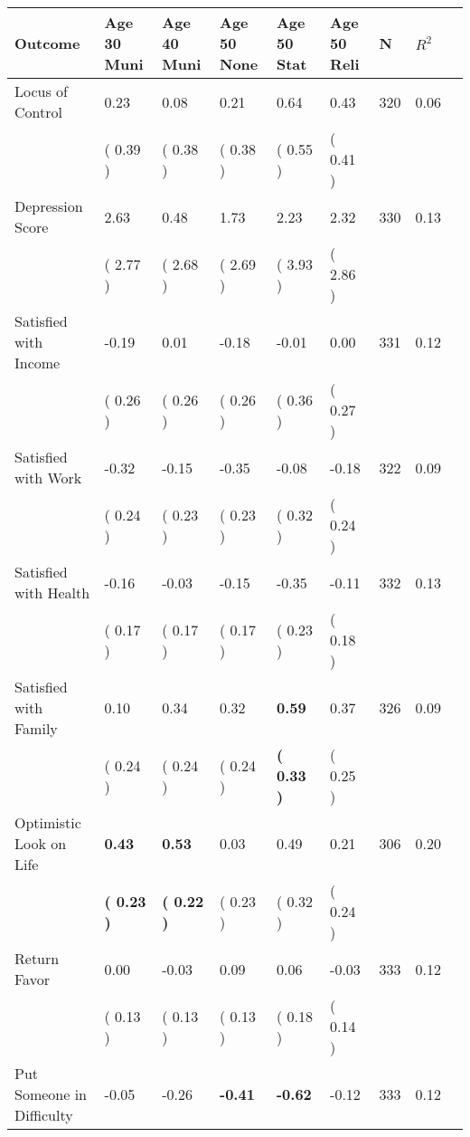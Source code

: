 \begin{tabular}{L{6.2cm} C{1.8cm} C{1.8cm} C{1.8cm} C{1.8cm} C{1.8cm} C{1.8cm} C{0.3cm} C{0.3cm}}
\toprule
 \textbf{Outcome} & \textbf{Age 30 Muni} & \textbf{Age 40 Muni} & \textbf{Age 50 None} & \textbf{Age 50 Stat} & \textbf{Age 50 Reli} & \textbf{N} & \textbf{$ R^2$} \\
\midrule
Locus of Control &      0.23 &      0.08 &      0.21 &      0.64 &      0.43  & 320 &       0.06 \\ 
 & (     0.39 ) & (     0.38 ) & (     0.38 ) & (     0.55 ) & (     0.41 )  & \\
Depression Score &      2.63 &      0.48 &      1.73 &      2.23 &      2.32  & 330 &       0.13 \\ 
 & (     2.77 ) & (     2.68 ) & (     2.69 ) & (     3.93 ) & (     2.86 )  & \\
Satisfied with Income &     -0.19 &      0.01 &     -0.18 &     -0.01 &      0.00  & 331 &       0.12 \\ 
 & (     0.26 ) & (     0.26 ) & (     0.26 ) & (     0.36 ) & (     0.27 )  & \\
Satisfied with Work &     -0.32 &     -0.15 &     -0.35 &     -0.08 &     -0.18  & 322 &       0.09 \\ 
 & (     0.24 ) & (     0.23 ) & (     0.23 ) & (     0.32 ) & (     0.24 )  & \\
Satisfied with Health &     -0.16 &     -0.03 &     -0.15 &     -0.35 &     -0.11  & 332 &       0.13 \\ 
 & (     0.17 ) & (     0.17 ) & (     0.17 ) & (     0.23 ) & (     0.18 )  & \\
Satisfied with Family &      0.10 &      0.34 &      0.32 & \textbf{     0.59} &      0.37  & 326 &       0.09 \\ 
 & (     0.24 ) & (     0.24 ) & (     0.24 ) & \textbf{(     0.33 )} & (     0.25 )  & \\
Optimistic Look on Life & \textbf{     0.43} & \textbf{     0.53} &      0.03 &      0.49 &      0.21  & 306 &       0.20 \\ 
 & \textbf{(     0.23 )} & \textbf{(     0.22 )} & (     0.23 ) & (     0.32 ) & (     0.24 )  & \\
Return Favor &      0.00 &     -0.03 &      0.09 &      0.06 &     -0.03  & 333 &       0.12 \\ 
 & (     0.13 ) & (     0.13 ) & (     0.13 ) & (     0.18 ) & (     0.14 )  & \\
Put Someone in Difficulty &     -0.05 &     -0.26 & \textbf{    -0.41} & \textbf{    -0.62} &     -0.12  & 333 &       0.12 \\ 

\end{tabular}
